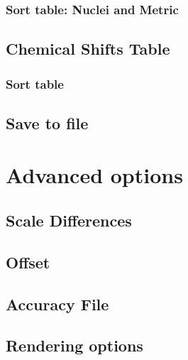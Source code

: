\documentclass{article}
\begin{document}
\subsubsection{Sort table: Nuclei and Metric}
\subsection{Chemical Shifts Table}
\subsubsection{Sort table}
\subsection{Save to file}


\newpage
\section{Advanced options}
\subsection{Scale Differences}
\subsection{Offset}
\subsection{Accuracy File}
\subsection{Rendering options}
\end{document}
